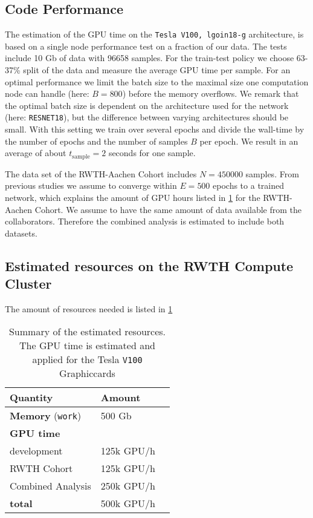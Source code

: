\documentclass[12pt]{article}
\begin{document}
\subsection{Code Performance}

The estimation of the GPU time on the \texttt{Tesla V100, lgoin18-g} architecture,
is based on a single node performance test on a fraction of our data.
The tests include 10 Gb of data with 96658 samples. For the train-test policy
we choose 63-37\% split of the data and measure the average GPU time per sample.
For an optimal performance we limit the batch size to the maximal size one computation node can handle (here: $B=800$) before the memory overflows. We remark that the optimal batch size is dependent on the architecture used for the network (here: \texttt{RESNET18}),
but the difference between varying architectures should be small.
With this setting we train over several epochs and divide the wall-time by the number
of epochs and the number of samples $B$ per epoch. We result in an average of about $t_\mathrm{sample}=2$ seconds for one sample.

The data set of the RWTH-Aachen Cohort includes $N=450000$ samples. From previous studies
we assume to converge within $E=500$ epochs to a trained network, which explains the amount of
GPU hours listed in \cref{tabl:resource} for the RWTH-Aachen Cohort. We assume to have the same amount of data available from the collaborators. Therefore the combined analysis
is estimated to include both datasets.

\subsection{Estimated resources on the RWTH Compute Cluster}

The amount of resources needed is listed in \cref{tabl:resource}

\begin{table}
	\centering
	\begin{tabular}{l l l}
		\toprule
		Quantity & Amount \\
		\midrule
		\textbf{Memory} (\texttt{work}) & 500 Gb \\
		\hline
		\textbf{GPU time} \\
		development & 125k GPU/h  \\
		RWTH Cohort & 125k GPU/h \\
		Combined Analysis & 250k GPU/h \\
		\hline
		\hline
		\textbf{total} &  500k GPU/h\\
		\bottomrule
	\end{tabular}
	\caption{Summary of the estimated resources. The GPU time is estimated and applied for the Tesla \texttt{V100} Graphiccards}
	\label{tabl:resource}
\end{table}
\end{document}
